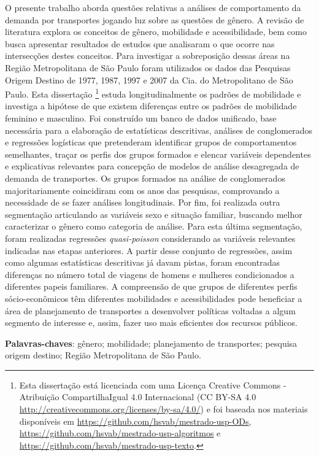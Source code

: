 \documentclass[
  12pt,        %
  openright,      %
  twoside,      %
  a4paper,      %
  english,      %
  brazil        %
]{abntex2}
\begin{document}
\setlength{\absparsep}{18pt} %
\begin{resumo}

O presente trabalho aborda questões relativas a análises de comportamento da demanda por transportes jogando luz sobre as questões de gênero. A revisão de literatura explora os conceitos de gênero, mobilidade e acessibilidade, bem como busca apresentar resultados de estudos que analisaram o que ocorre nas intersecções destes conceitos. Para investigar a sobreposição dessas áreas na Região Metropolitana de São Paulo foram utilizados os dados das Pesquisas Origem Destino de 1977, 1987, 1997 e 2007 da Cia. do Metropolitano de São Paulo.
Esta dissertação
\footnote{Esta dissertação está licenciada com uma Licença Creative Commons - Atribuição CompartilhaIgual 4.0 Internacional (CC BY-SA 4.0 \url{http://creativecommons.org/licenses/by-sa/4.0/}) e foi baseada nos materiais disponíveis em \url{https://github.com/hsvab/mestrado-usp-ODs}, \url{https://github.com/hsvab/mestrado-usp-algoritmos} e \url{https://github.com/hsvab/mestrado-usp-texto}. } estuda longitudinalmente os padrões de mobilidade e investiga a hipótese de que existem diferenças entre os padrões de mobilidade feminino e masculino. 
Foi construído um banco de dados unificado, base necessária para a elaboração de estatísticas descritivas, análises de conglomerados e regressões logísticas que pretenderam identificar grupos de comportamentos semelhantes, traçar os perfis dos grupos formados e elencar variáveis dependentes e explicativas relevantes para concepção de modelos de análise desagregada de demanda de transportes.
Os grupos formados na análise de conglomerados majoritariamente coincidiram com os anos das pesquisas, comprovando a necessidade de se fazer análises longitudinais.
Por fim, foi realizada outra segmentação articulando as variáveis sexo e situação familiar, buscando melhor caracterizar o gênero como categoria de análise.
Para esta última segmentação, foram realizadas regressões \textit{quasi-poisson} considerando as variáveis relevantes indicadas nas etapas anteriores. A partir desse conjunto de regressões, assim como algumas estatísticas descritivas já davam pistas, foram encontradas diferenças no número total de viagens de homens e mulheres condicionados a diferentes papeis familiares.
A compreensão de que grupos de diferentes perfis sócio-econômicos têm diferentes mobilidades e acessibilidades pode beneficiar a área de planejamento de transportes a desenvolver políticas voltadas a algum segmento de interesse e, assim, fazer uso mais eficientes dos recursos públicos.

 \textbf{Palavras-chaves}: gênero; mobilidade; planejamento de transportes; pesquisa origem destino; Região Metropolitana de São Paulo.
\end{resumo}
\end{document}
